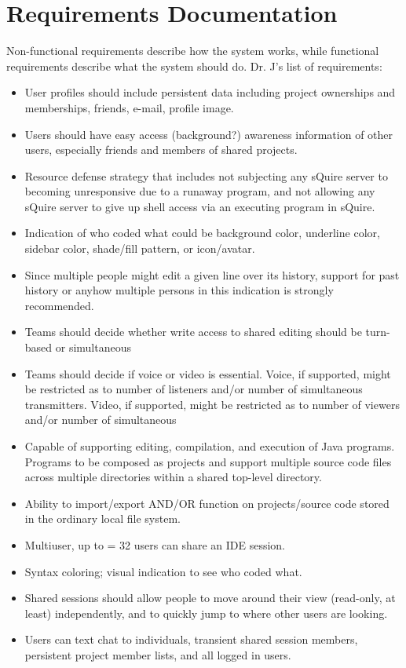 \documentclass[11pt]{report}
\begin{document}
\chapter{Requirements Documentation}
    Non-functional requirements describe how the system works, while functional requirements describe what the system should do. Dr. J's list of requirements:
    \begin{itemize}
        \item User profiles should include persistent data including project ownerships and  memberships, friends, e-mail, profile image.
        \item Users should have easy access (background?) awareness information of other users, especially friends and members of shared projects.
        \item Resource defense strategy that includes not subjecting any sQuire server to becoming unresponsive due to a runaway program, and not allowing any sQuire server to give up shell access via an executing program in sQuire.
        \item Indication of who coded what could be background color, underline color, sidebar color, shade/fill pattern, or icon/avatar. 
        \item Since multiple people might edit a given line over its history, support for past history or anyhow multiple persons in this indication is strongly recommended.
        \item Teams should decide whether write access to shared editing should be turn-based or simultaneous
        \item Teams should decide if voice or video is essential. Voice, if supported, might be restricted as to number of listeners and/or number of simultaneous transmitters. Video, if supported, might be restricted as to number of viewers and/or number of simultaneous
        \item Capable of supporting editing, compilation, and execution of Java programs. Programs to be composed as projects and support multiple source code files across multiple directories within a shared top-level directory.
        \item Ability to import/export AND/OR function on projects/source code stored in the ordinary local file system.
        \item Multiuser, up to \>= 32 users can share an IDE session.
        \item Syntax coloring; visual indication to see who coded what.
        \item Shared sessions should allow people to move around their view (read-only, at least) independently, and to quickly jump to where other users are looking.
        \item Users can text chat to individuals, transient shared session members, persistent project member lists, and all logged in users.
    \end{itemize}
\end{document}
